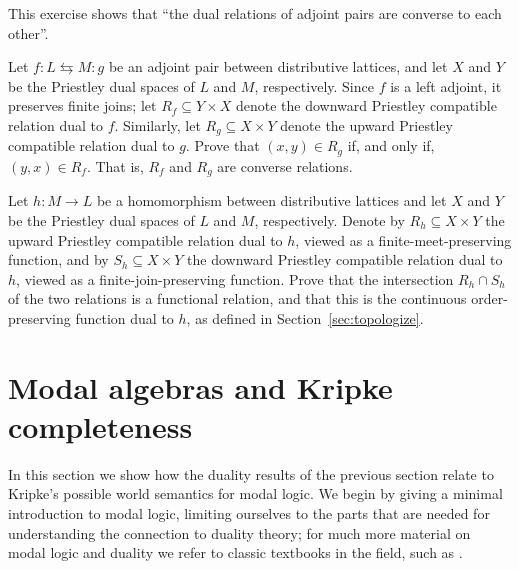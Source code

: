 \begin{exercise}\label{exe:converse-adjunction}
  This exercise shows that ``the dual relations of adjoint pairs are converse to each other''. 

Let $f \colon L \leftrightarrows M \colon g$ be an adjoint pair between distributive lattices, and let $X$ and $Y$ be the Priestley dual spaces of $L$ and $M$, respectively. Since $f$ is a left adjoint, it preserves finite joins; let $R_f \subseteq Y \times X$ denote the downward Priestley compatible relation dual to $f$. Similarly, let $R_g \subseteq X \times Y$ denote the upward Priestley compatible relation dual to $g$. Prove that $(x,y) \in R_g$ if, and only if, $(y,x) \in R_f$. That is, $R_f$ and $R_g$ are converse relations.
\end{exercise}

\begin{exercise}\label{exe:functional-relation}
Let $h \colon M \to L$ be a homomorphism between distributive lattices and let $X$ and $Y$ be the Priestley dual spaces of $L$ and $M$, respectively. Denote by $R_h \subseteq X \times Y$ the upward Priestley compatible relation dual to $h$, viewed as a finite-meet-preserving function, and by $S_h \subseteq X \times Y$ the downward Priestley compatible relation dual to $h$, viewed as a finite-join-preserving function. Prove that the intersection $R_h \cap S_h$ of the two relations is a functional relation, and that this is the continuous order-preserving function dual to $h$, as defined in Section~\ref{sec:topologize}.
\end{exercise}

\section{Modal algebras and Kripke completeness}\label{sec:kripke}
In this section we show how the duality results of the previous section relate to Kripke's possible world semantics for modal logic. We begin by giving a minimal introduction to modal logic, limiting ourselves to the parts that are needed for understanding the connection to duality theory; for much more material on modal logic and duality we refer to classic textbooks in the field, such as \cite{BRV2001, ChaZak1997}.

